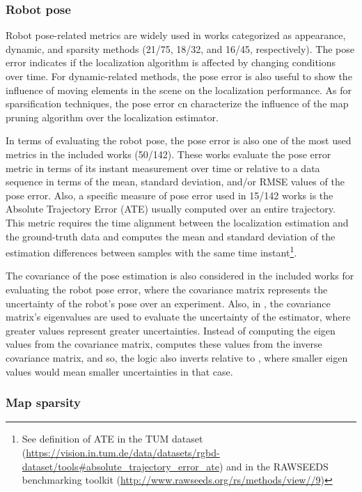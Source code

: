 \subsubsection{Robot pose}

Robot pose-related metrics are widely used in works categorized as appearance, dynamic, and sparsity methods (21/75, 18/32, and 16/45, respectively). The pose error indicates if the localization algorithm is affected by changing conditions over time. For dynamic-related methods, the pose error is also useful to show the influence of moving elements in the scene on the localization performance. As for sparsification techniques, the pose error cn characterize the influence of the map pruning algorithm over the localization estimator.

In terms of evaluating the robot pose, the pose error is also one of the most used metrics in the included works (50/142). These works evaluate the pose error metric in terms of its instant measurement over time or relative to a data sequence in terms of the mean, standard deviation, and/or RMSE values of the pose error. Also, a specific measure of pose error used in 15/142 works is the Absolute Trajectory Error (ATE) usually computed over an entire trajectory. This metric requires the time alignment between the localization estimation and the ground-truth data and computes the mean and standard deviation of the estimation differences between samples with the same time instant\footnote{See definition of ATE in the TUM dataset (\url{https://vision.in.tum.de/data/datasets/rgbd-dataset/tools\#absolute\_trajectory\_error\_ate}) and in the RAWSEEDS benchmarking toolkit (\url{http://www.rawseeds.org/rs/methods/view//9})}.

The covariance of the pose estimation is also considered in the included works for evaluating the robot pose error, where the covariance matrix represents the uncertainty of the robot's pose over an experiment. Also, in \cite{hochdorfer-schlegel:2009}, the covariance matrix's eigenvalues are used to evaluate the uncertainty of the estimator, where greater values represent greater uncertainties. Instead of computing the eigen values from the covariance matrix, \cite{dayoub-duckett:2008:4650701} computes these values from the inverse covariance matrix, and so, the logic also inverts relative to \cite{hochdorfer-schlegel:2009}, where smaller eigen values would mean smaller uncertainties in that case.



\subsubsection{Map sparsity}

